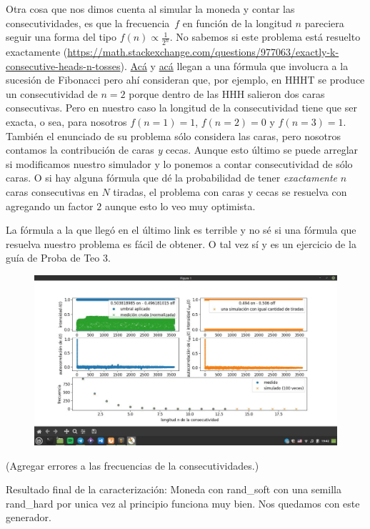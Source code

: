 \documentclass[a4paper]{article}
\begin{document}
Otra cosa que nos dimos cuenta al simular la moneda y contar las consecutividades, es que la frecuencia~$f$ en función de la longitud $n$ pareciera seguir una forma del tipo $f(n) \propto \frac{1}{2^n}$.
No sabemos si este problema está resuelto exactamente (\url{https://math.stackexchange.com/questions/977063/exactly-k-consecutive-heads-n-tosses}).
\href{https://math.stackexchange.com/questions/148353/given-n-raffles-what-is-the-chance-of-winning-k-in-a-row}{Acá} y \href{https://marknelson.us/posts/2011/01/17/20-heads-in-a-row-what-are-the-odds.html}{acá} llegan a una fórmula que involucra a la sucesión de Fibonacci pero ahí consideran que, por ejemplo, en HHHT se produce un consecutividad de $n=2$ porque dentro de las HHH salieron dos caras consecutivas.
Pero en nuestro caso la longitud de la consecutividad tiene que ser exacta, o sea, para nosotros $f(n=1)=1$, $f(n=2)=0$ y $f(n=3)=1$.
También el enunciado de su problema sólo considera las caras, pero nosotros contamos la contribución de caras \emph{y} cecas.
Aunque esto último se puede arreglar si modificamos nuestro simulador y lo ponemos a contar consecutividad de sólo caras.
O si hay alguna fórmula que dé la probabilidad de tener \emph{exactamente} $n$ caras consecutivas en $N$ tiradas, el problema con caras y cecas se resuelva con agregando un factor $2$ aunque esto lo veo muy optimista.

La fórmula a la que llegó en el último link es terrible y no sé si una fórmula que resuelva nuestro problema es fácil de obtener.
O tal vez sí y es un ejercicio de la guía de Proba de Teo 3.

\begin{figure}
	\includegraphics[width=\linewidth]{Resultados/moneda_bien.jpg}
\end{figure}

(Agregar errores a las frecuencias de la consecutividades.)

Resultado final de la caracterización: Moneda con rand\_soft con una semilla rand\_hard por unica vez al principio funciona muy bien. Nos quedamos con este generador.
\end{document}
